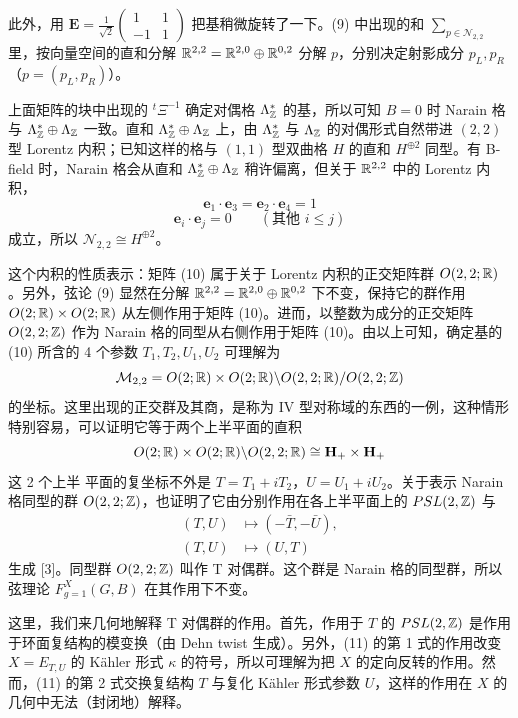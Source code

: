 此外，用 $\mathbf{E}=\frac{1}{\sqrt{2}}\begin{pmatrix}1&1\\-1&1\end{pmatrix}$ 把基稍微旋转了一下。(9) 中出现的和 $\sum_{p\in\mathcal{N}_{2,2}}$ 里，按向量空间的直和分解 $\mathbb{R}^{2,2}=\mathbb{R}^{2,0}\oplus\mathbb{R}^{0,2}$ 分解 $p$，分别决定射影成分 $p_L,p_R$（$p=(p_L,p_R)$）。

上面矩阵的块中出现的 ${}^t\Xi^{-1}$ 确定对偶格 $\Lambda_{\mathbb{Z}}^*$ 的基，所以可知 $B=0$ 时 Narain 格与 $\Lambda_{\mathbb{Z}}^*\oplus\Lambda_{\mathbb{Z}}$ 一致。直和 $\Lambda_{\mathbb{Z}}^*\oplus\Lambda_{\mathbb{Z}}$ 上，由 $\Lambda_{\mathbb{Z}}^*$ 与 $\Lambda_{\mathbb{Z}}$ 的对偶形式自然带进 $(2,2)$ 型 Lorentz 内积；已知这样的格与 $(1,1)$ 型双曲格 $H$ 的直和 $H^{\oplus 2}$ 同型。有 B-field 时，Narain 格会从直和 $\Lambda_{\mathbb{Z}}^*\oplus\Lambda_{\mathbb{Z}}$ 稍许偏离，但关于 $\mathbb{R}^{2,2}$ 中的 Lorentz 内积，
\[
  \mathbf{e}_1\cdot\mathbf{e}_3=\mathbf{e}_2\cdot\mathbf{e}_4=1
\]
\[
  \mathbf{e}_i\cdot\mathbf{e}_j=0\qquad(\text{其他 } i\le j)
\]
成立，所以 $\mathcal{N}_{2,2}\cong H^{\oplus 2}$。

这个内积的性质表示：矩阵 (10) 属于关于 Lorentz 内积的正交矩阵群 $O(2,2;\mathbb{R})$。另外，弦论 (9) 显然在分解 $\mathbb{R}^{2,2}=\mathbb{R}^{2,0}\oplus\mathbb{R}^{0,2}$ 下不变，保持它的群作用 $O(2;\mathbb{R})\times O(2;\mathbb{R})$ 从左侧作用于矩阵 (10)。进而，以整数为成分的正交矩阵 $O(2,2;\mathbb{Z})$ 作为 Narain 格的同型从右侧作用于矩阵 (10)。由以上可知，确定基的 (10) 所含的 4 个参数 $T_1,T_2,U_1,U_2$ 可理解为
\[
  \mathcal{M}_{2,2}=O(2;\mathbb{R})\times O(2;\mathbb{R})\backslash O(2,2;\mathbb{R})/O(2,2;\mathbb{Z})
\]
的坐标。这里出现的正交群及其商，是称为 IV 型对称域的东西的一例，这种情形特别容易，可以证明它等于两个上半平面的直积
\[
  O(2;\mathbb{R})\times O(2;\mathbb{R})\backslash O(2,2;\mathbb{R})\cong\mathbf{H}_+\times\mathbf{H}_+
\]
这 2 个上半
平面的复坐标不外是 $T=T_1+iT_2$，$U=U_1+iU_2$。关于表示 Narain 格同型的群 $O(2,2;\mathbb{Z})$，也证明了它由分别作用在各上半平面上的 $PSL(2,\mathbb{Z})$ 与
\begin{equation}
\begin{aligned}
  (T,U)&\longmapsto(-\bar T,-\bar U),\\
  (T,U)&\longmapsto(U,T)
\end{aligned}
\tag{11}
\end{equation}
生成 [3]。同型群 $O(2,2;\mathbb{Z})$ 叫作 T 对偶群。这个群是 Narain 格的同型群，所以弦理论 $F_{g=1}^X(G,B)$ 在其作用下不变。

这里，我们来几何地解释 T 对偶群的作用。首先，作用于 $T$ 的 $PSL(2,\mathbb{Z})$ 是作用于环面复结构的模变换（由 Dehn twist 生成）。另外，(11) 的第 1 式的作用改变 $X=E_{T,U}$ 的 Kähler 形式 $\kappa$ 的符号，所以可理解为把 $X$ 的定向反转的作用。然而，(11) 的第 2 式交换复结构 $T$ 与复化 Kähler 形式参数 $U$，这样的作用在 $X$ 的几何中无法（封闭地）解释。

